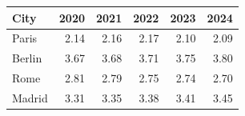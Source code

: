 \begin{table}[htbp]
\centering
\begin{tabular}{lrrrrr}
\toprule
City & 2020 & 2021 & 2022 & 2023 & 2024 \\
\midrule
Paris & 2.14 & 2.16 & 2.17 & 2.10 & 2.09 \\
Berlin & 3.67 & 3.68 & 3.71 & 3.75 & 3.80 \\
Rome & 2.81 & 2.79 & 2.75 & 2.74 & 2.70 \\
Madrid & 3.31 & 3.35 & 3.38 & 3.41 & 3.45 \\
\bottomrule
\end{tabular}
\end{table}
